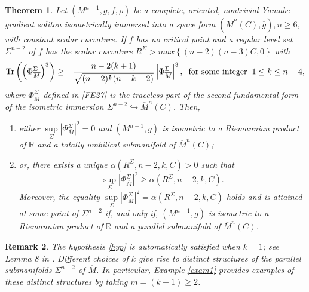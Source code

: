 \documentclass[11pt]{amsart}
\DeclareMathOperator{\Tr}{Tr}
\newtheorem{theorem}{Theorem}[section]
\newtheorem{remark}[theorem]{Remark}
\numberwithin{equation}{section}
\begin{document}
    \begin{theorem}\label{thm1}
         Let $\left(M^{n-1}, g, f, \rho\right)$ be a complete, oriented, nontrivial Yamabe gradient soliton isometrically immersed into a space form $\left(\overline{M}^n(C), \overline{g}\right), n\ge 6$, with constant scalar curvature. If $f$ has no critical point and a regular level set $\Sigma^{n-2}$ of $f$ has the scalar curvature $R^{\Sigma}>max\left\{(n-2)(n-3)C, 0\right\}$ with
         \begin{equation}\label{hyp}
             \Tr\left(\left(\Phi^{\Sigma}_{\overline{M}}\right)^3\right)\ge -\frac{n-2(k+1)}{\sqrt{(n-2)k(n-k-2)}} \left|\Phi^{\Sigma}_{\overline{M}}\right|^3, \hspace{2mm}\text{for some integer}\hspace{2mm} 1\le k\le n-4,
         \end{equation}
         where $\Phi^{\Sigma}_{\overline{M}}$ defined in \eqref{FE27} is the traceless part of the second fundamental form of the isometric immersion $\Sigma^{n-2} \hookrightarrow \overline{M}^n(C)$.
         Then,
             \begin{enumerate}
                 \item either $\sup\limits_{\Sigma}  \left|\Phi^{\Sigma}_{\overline{M}}\right|^2=0$ and $(M^{n-1}, g)$ is isometric to a Riemannian product of $\mathbb{R}$ and a totally umbilical submanifold of $\overline{M}^n(C)$; 
                 \item or, there exists a unique $\alpha \left(R^{\Sigma}, n-2, k, C\right)>0$ such that
                 \begin{equation*}
                     \sup_{\Sigma}\left|\Phi^{\Sigma}_{\overline{M}}\right|^2\ge \alpha \left(R^{\Sigma}, n-2, k, C\right).
                 \end{equation*}
                  Moreover, the equality $\sup\limits_{\Sigma}\left|\Phi^{\Sigma}_{\overline{M}}\right|^2= \alpha \left(R^{\Sigma}, n-2, k, C\right)$ holds and is attained at some point of $\Sigma^{n-2}$ if, and only if, $\left(M^{n-1}, g\right)$ is isometric to a Riemannian product of $\mathbb{R}$ and a parallel submanifold of $\overline{M}^n(C)$.
                
          
             \end{enumerate}
           
    \end{theorem}
\begin{remark}
   The hypothesis \ref{hyp} is automatically satisfied when $k=1$; see Lemma 8 in \cite{alias2012}. Different choices of $k$ give rise to distinct structures of the parallel submanifolds $\Sigma^{n-2}$ of $\overline{M}$. In particular, Example \ref{exam1} provides examples of these distinct structures by taking $m=(k+1)\ge 2$.
\end{remark}  
\end{document}
